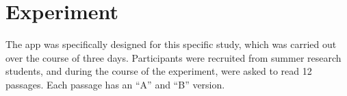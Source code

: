 \documentclass[11pt,letterpaper]{article}
\begin{document}
	\section{Experiment}
	\label{sec:exp}
	
	The app was specifically designed for this specific study, which was carried out over the course of three days. Participants were recruited from summer research students, and during the course of the experiment, were asked to read 12 passages. Each passage has an ``A'' and ``B'' version.
	
%	
%	
%	
%	
\end{document}
